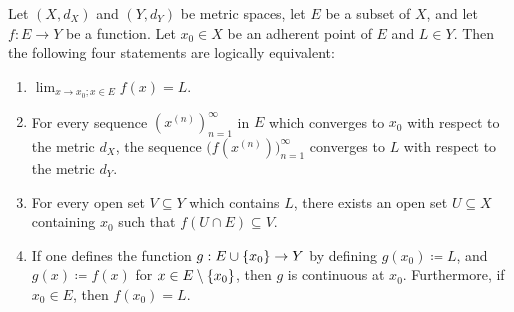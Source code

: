 \begin{prop}\label{ii:3.1.5}
  Let \((X, d_X)\) and \((Y, d_Y)\) be metric spaces, let \(E\) be a subset of \(X\), and let \(f : E \to Y\) be a function.
  Let \(x_0 \in X\) be an adherent point of \(E\) and \(L \in Y\).
  Then the following four statements are logically equivalent:
  \begin{enumerate}
    \item \(\lim_{x \to x_0 ; x \in E} f(x) = L\).
    \item For every sequence \((x^{(n)})_{n = 1}^\infty\) in \(E\) which converges to \(x_0\) with respect to the metric \(d_X\), the sequence \(\big(f(x^{(n)})\big)_{n = 1}^\infty\) converges to \(L\) with respect to the metric \(d_Y\).
    \item For every open set \(V \subseteq Y\) which contains \(L\), there exists an open set \(U \subseteq X\) containing \(x_0\) such that \(f(U \cap E) \subseteq V\).
    \item If one defines the function \(g : E \cup \left\lbrace x_0\right\rbrace \to Y\) by defining \(g(x_0) \coloneqq L\), and \(g(x) \coloneqq f(x)\) for \(x \in E \setminus \left\lbrace x_0\right\rbrace\), then \(g\) is continuous at \(x_0\).
          Furthermore, if \(x_0 \in E\), then \(f(x_0) = L\).
  \end{enumerate}
\end{prop}

